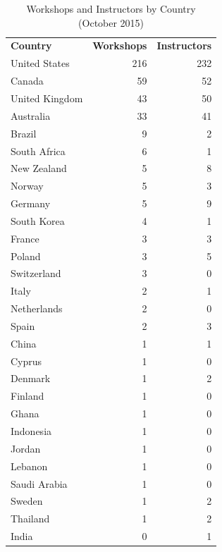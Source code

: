 \documentclass[10pt,a4paper,twocolumn]{article}
\begin{document}
\begin{table}[h]
\begin{tabular}{lrr}
\textbf{Country} & \textbf{Workshops} & \textbf{Instructors} \\
United States & 216 & 232 \\
Canada & 59 & 52 \\
United Kingdom & 43 & 50 \\
Australia & 33 & 41 \\
Brazil & 9 & 2 \\
South Africa & 6 & 1 \\
New Zealand & 5 & 8 \\
Norway & 5 & 3 \\
Germany & 5 & 9 \\
South Korea & 4 & 1 \\
France & 3 & 3 \\
Poland & 3 & 5 \\
Switzerland & 3 & 0 \\
Italy & 2 & 1 \\
Netherlands & 2 & 0 \\
Spain & 2 & 3 \\
China & 1 & 1 \\
Cyprus & 1 & 0 \\
Denmark & 1 & 2 \\
Finland & 1 & 0 \\
Ghana & 1 & 0 \\
Indonesia & 1 & 0 \\
Jordan & 1 & 0 \\
Lebanon & 1 & 0 \\
Saudi Arabia & 1 & 0 \\
Sweden & 1 & 2 \\
Thailand & 1 & 2 \\
India & 0 & 1 \\
\end{tabular}
\caption{Workshops and Instructors by Country (October 2015)}
\label{t:by-country}
\end{table}

\clearpage

\nocite{*}
{\small
}
\end{document}
